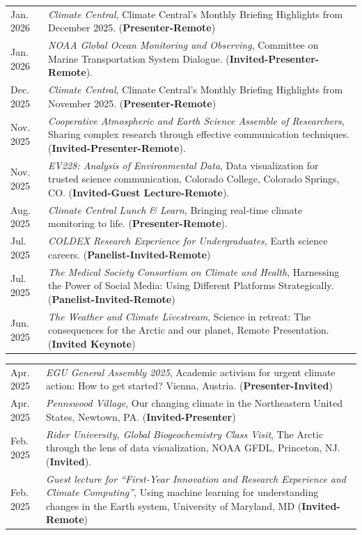 \documentclass[margin,line,palatino,courier,10pt]{res}
\begin{document}
\begin{resume}
\begin{tabular}{@{}p{0.9in}p{4in}}
Jan. 2026 & \textit{Climate Central}, Climate Central's Monthly Briefing Highlights from December 2025. (\textbf{Presenter-Remote})\\
Jan. 2026 & \textit{NOAA Global Ocean Monitoring and Observing}, Committee on Marine Transportation System Dialogue. (\textbf{Invited-Presenter-Remote}).\\
Dec. 2025 & \textit{Climate Central}, Climate Central's Monthly Briefing Highlights from November 2025. (\textbf{Presenter-Remote})\\
Nov. 2025 & \textit{Cooperative Atmospheric and Earth Science Assemble of Researchers}, Sharing complex research through effective communication techniques. (\textbf{Invited-Presenter-Remote}).\\
Nov. 2025 & \textit{EV228: Analysis of Environmental Data}, Data visualization for trusted science communication, Colorado College, Colorado Springs, CO. (\textbf{Invited-Guest Lecture-Remote}).\\
Aug. 2025 & \textit{Climate Central Lunch \& Learn}, Bringing real-time climate monitoring to life. (\textbf{Presenter-Remote}).\\
Jul. 2025 & \textit{COLDEX Research Experience for Undergraduates}, Earth science careers. (\textbf{Panelist-Invited-Remote})\\
Jul. 2025 & \textit{The Medical Society Consortium on Climate and Health}, Harnessing the Power of Social Media: Using Different Platforms Strategically. (\textbf{Panelist-Invited-Remote})\\
Jun. 2025 & \textit{The Weather and Climate Livestream}, Science in retreat: The consequences for the Arctic and our planet, Remote Presentation. (\textbf{Invited Keynote})\\
\end{tabular}
\begin{tabular}{@{}p{0.9in}p{4in}}
Apr. 2025 & \textit{EGU General Assembly 2025}, Academic activism for urgent climate action: How to get started? Vienna, Austria. (\textbf{Presenter-Invited})\\
Apr. 2025 & \textit{Pennswood Village}, Our changing climate in the Northeastern United States, Newtown, PA. (\textbf{Invited-Presenter})\\
Feb. 2025 & \textit{Rider University, Global Biogeochemistry Class Visit}, The Arctic through the lens of data visualization, NOAA GFDL, Princeton, NJ. (\textbf{Invited}).\\
Feb. 2025 & \textit{Guest lecture for ``First-Year Innovation and Research Experience and Climate Computing''}, Using machine learning for understanding changes in the Earth system, University of Maryland, MD (\textbf{Invited-Remote})\\

\end{tabular}
\end{resume}
\end{document}
